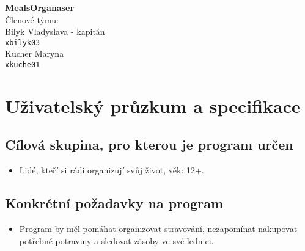 \documentclass[a4paper,12pt]{article}
\begin{document}
\begin{titlepage}
    \centering
    \vspace*{\fill}
    {\LARGE \textbf{MealsOrganaser}}\\[1.5cm]
    Členové týmu:\\[0.5cm]
    Bilyk Vladyslava - kapitán \\
    \texttt{xbilyk03} \\[0.5cm]
    Kucher Maryna \\
    \texttt{xkuche01} 
    \vspace*{\fill}
\end{titlepage}

\newpage

\section*{Uživatelský průzkum a specifikace}

\subsection*{Cílová skupina, pro kterou je program určen}
\begin{itemize}
    \item Lidé, kteří si rádi organizují svůj život, věk: 12+.
\end{itemize}
\subsection*{Konkrétní požadavky na program}
\begin{itemize}
    \item Program by měl pomáhat organizovat stravování, nezapomínat nakupovat potřebné potraviny a sledovat zásoby ve své lednici.
\end{itemize}
\end{document}
